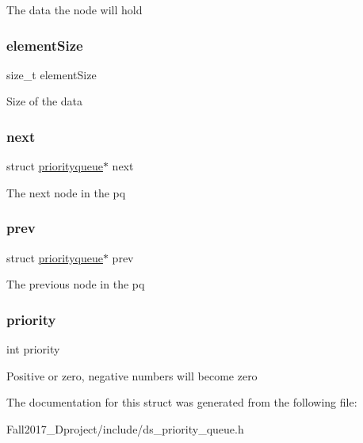 The data the node will hold \mbox{\label{structpriorityqueue_af884332e6713af9425451adde09e0024}} 
\subsubsection{\texorpdfstring{element\+Size}{elementSize}}
{\footnotesize\ttfamily size\+\_\+t element\+Size}

Size of the data \mbox{\label{structpriorityqueue_ad201c27ab3b5d056b515abec6484d679}} 
\subsubsection{\texorpdfstring{next}{next}}
{\footnotesize\ttfamily struct \hyperlink{structpriorityqueue}{priorityqueue}$\ast$ next}

The next node in the pq \mbox{\label{structpriorityqueue_a21f8d5cee7f9863e99c26f3a3120efb7}} 
\subsubsection{\texorpdfstring{prev}{prev}}
{\footnotesize\ttfamily struct \hyperlink{structpriorityqueue}{priorityqueue}$\ast$ prev}

The previous node in the pq \mbox{\label{structpriorityqueue_acec9ce2df15222151ad66fcb1d74eb9f}} 
\subsubsection{\texorpdfstring{priority}{priority}}
{\footnotesize\ttfamily int priority}

Positive or zero, negative numbers will become zero 

The documentation for this struct was generated from the following file\+:\begin{DoxyCompactItemize}
\item 
Fall2017\+\_\+Dproject/include/ds\+\_\+priority\+\_\+queue.\+h\end{DoxyCompactItemize}
